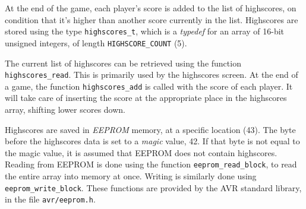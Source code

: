 At the end of the game, each player's score is added to the list of highscores,
on condition that it's higher than another score currently in the list.
Highscores are stored using the type \texttt{highscores\_t}, which is a
\emph{typedef} for an array of 16-bit unsigned integers, of length
\texttt{HIGHSCORE\_COUNT} (5).

The current list of highscores can be retrieved using the function
\texttt{highscores\_read}. This is primarily used by the highscores screen.
At the end of a game, the function \texttt{highscores\_add} is called with the
score of each player. It will take care of inserting the score at the
appropriate place in the highscores array, shifting lower scores down.

Highscores are saved in \emph{EEPROM} memory, at a specific location (43). The
byte before the highscores data is set to a \emph{magic} value, 42. If that
byte is not equal to the magic value, it is assumed that EEPROM does not
contain highscores. Reading from EEPROM is done using the function
\texttt{eeprom\_read\_block}, to read the entire array into memory at once.
Writing is similarly done using \texttt{eeprom\_write\_block}. These functions
are provided by the AVR standard library, in the file \texttt{avr/eeprom.h}.
